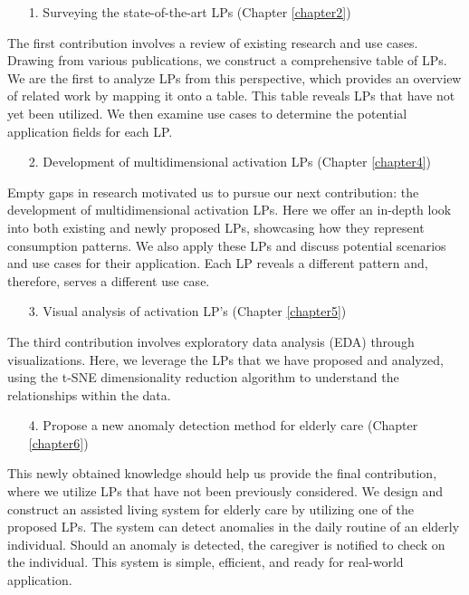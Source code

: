 \begin{enumerate}
	\item[1.] Surveying the state-of-the-art LPs (Chapter \ref{chapter2})
\end{enumerate}

The first contribution involves a review of existing research and use cases.
Drawing from various publications, we construct a comprehensive table of LPs. 
We are the first to analyze LPs from this perspective, which provides an overview of related work by mapping it onto a table.
This table reveals LPs that have not yet been utilized.
We then examine use cases to determine the potential application fields for each LP.

\begin{enumerate}
	\item[2.] Development of multidimensional activation LPs (Chapter \ref{chapter4})
\end{enumerate}

Empty gaps in research motivated us to pursue our next contribution: the development of multidimensional activation LPs. 
Here we offer an in-depth look into both existing and newly proposed LPs, showcasing how they represent consumption patterns.
We also apply these LPs and discuss potential scenarios and use cases for their application. 
Each LP reveals a different pattern and, therefore, serves a different use case. 

\begin{enumerate}
	\item[3.] Visual analysis of activation LP's (Chapter \ref{chapter5})
\end{enumerate}

The third contribution involves exploratory data analysis (EDA) through visualizations.
Here, we leverage the LPs that we have proposed and analyzed, using the t-SNE dimensionality reduction algorithm to understand the relationships within the data.

\begin{enumerate}
	\item[4.] Propose a new anomaly detection method for elderly care (Chapter \ref{chapter6})
\end{enumerate}

This newly obtained knowledge should help us provide the final contribution, where we utilize LPs that have not been previously considered.
We design and construct an assisted living system for elderly care by utilizing one of the proposed LPs.
The system can detect anomalies in the daily routine of an elderly individual.
Should an anomaly is detected, the caregiver is notified to check on the individual. 
This system is simple, efficient, and ready for real-world application.